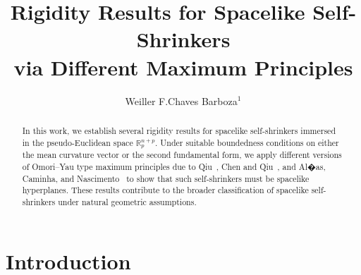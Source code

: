 \documentclass[leqno,11pt]{amsart}
\title[On the rigidity of spacelike self-shrinker in $\mathbb{R}^{n+p}_p$]{Rigidity Results for Spacelike Self-Shrinkers \\ via Different Maximum Principles}
\author[W.F.C. Barboza]{Weiller F.Chaves Barboza$^{1}$}
\theoremstyle{plain}
\theoremstyle{definition}
\numberwithin{equation}{section}
\begin{document}
\maketitle

\begin{abstract}
In this work, we establish several rigidity results for spacelike self-shrinkers immersed in the pseudo-Euclidean space $\mathbb{R}^{n+p}_p$. Under suitable boundedness conditions on either the mean curvature vector or the second fundamental form, we apply different versions of Omori--Yau type maximum principles due to Qiu~\cite{Qiu:2021}, Chen and Qiu~\cite{QH:16}, and Al�as, Caminha, and Nascimento~\cite{Alias-Caminha-Nascimento:2019} to show that such self-shrinkers must be spacelike hyperplanes. These results contribute to the broader classification of spacelike self-shrinkers under natural geometric assumptions.

\end{abstract}

\section{Introduction}\label{introduction}
\justifying
\end{document}
